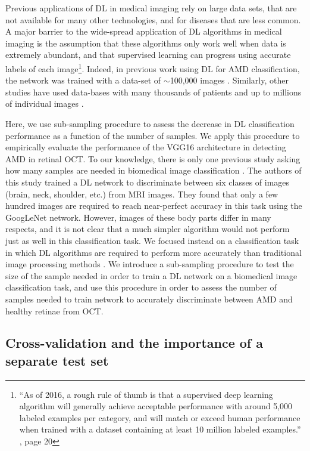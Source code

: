 Previous applications of DL in medical imaging rely on large data sets, that
are not available for many other technologies, and for diseases that are less
common. A major barrier to the wide-spread application of DL algorithms in
medical imaging is the assumption that these algorithms only work well when
data is extremely abundant, and that supervised learning can progress using
accurate labels of each image\footnote{``As of 2016, a rough rule of thumb is
that a supervised deep learning algorithm will generally achieve acceptable
performance with around 5,000 labeled examples per category, and will match or
exceed human performance when trained with a dataset containing at least 10
million labeled examples.'' \citep{Goodfellow-et-al-2016}, page 20}. Indeed, in
previous work using DL for AMD classification, the network was trained with a
data-set of $\sim$100,000 images \citep{lee2017deep}. Similarly, other studies
have used data-bases with many thousands of patients and up to millions of
individual images \citep{Kermany2018-bq}.

Here, we use sub-sampling procedure to assess the decrease in DL
classification performance as a function of the number of samples. We apply this
procedure to empirically evaluate the performance of the VGG16 architecture in
detecting AMD in retinal OCT. To our knowledge, there is only one previous
study asking how many samples are needed in biomedical image classification
\citep{Cho2015data_size}. The authors of this study trained a DL network to
discriminate between six classes of images (brain, neck, shoulder, etc.) from
MRI images. They found that only a few hundred images are required to reach
near-perfect accuracy in this task using the GoogLeNet network. However, images
of these body parts differ in many respects, and it is not clear that a much
simpler algorithm would not perform just as well in this classification task.
We focused instead on a classification task in which DL algorithms are required
to perform more accurately than traditional image processing methods
\citep{Lemaitre2016-gu}. We introduce a sub-sampling procedure to test the size
of the sample needed in order to train a DL network on a biomedical image
classification task, and use this procedure in order to assess the number of
samples needed to train network to accurately discriminate between AMD and
healthy retinae from OCT.

\subsection{Cross-validation and the importance of a separate test set}

